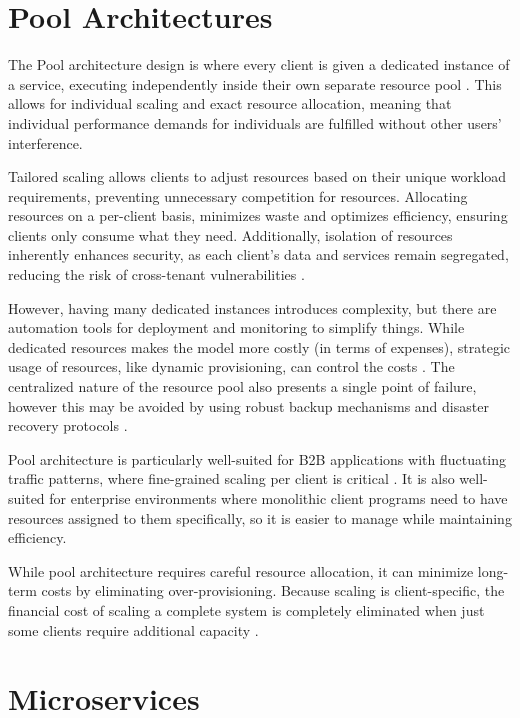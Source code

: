 \documentclass[]{final}
\begin{document}
\section{Pool Architectures}
The Pool architecture design is where every client is given a dedicated instance
of a service, executing independently inside their own separate resource pool \cite{cubet_microservice_nodate}.
This allows for individual scaling and exact resource allocation, meaning that
individual performance demands for individuals are fulfilled without other
users' interference.

Tailored scaling allows clients to adjust resources based on their unique
workload requirements, preventing unnecessary competition for resources.
Allocating resources on a per-client basis, minimizes waste and optimizes efficiency,
ensuring clients only consume what they need.
Additionally, isolation of resources inherently enhances security, as each client’s
data and services remain segregated, reducing the risk of cross-tenant
vulnerabilities \cite{cubet_microservice_nodate}.

However, having many dedicated instances introduces complexity, but there are automation
tools for deployment and monitoring to simplify things. While dedicated resources makes the model more
costly (in terms of expenses), strategic usage of resources, like dynamic provisioning, can control the costs \cite{cubet_microservice_nodate}. The
centralized nature of the resource pool also presents a single point of failure, however this may be
avoided by using robust backup mechanisms and disaster recovery protocols \cite{cubet_microservice_nodate}.

Pool architecture is particularly well-suited for B2B applications with
fluctuating traffic patterns,
where fine-grained scaling per client is critical \cite{cubet_microservice_nodate}. It is also well-suited
for enterprise environments where monolithic client programs need to have resources
assigned to them specifically, so it is easier to manage while maintaining efficiency.

While pool architecture requires careful resource allocation, it can minimize
long-term costs by eliminating over-provisioning. Because scaling is client-specific,
the financial cost of scaling a complete system is completely eliminated when just some
clients require additional capacity \cite{cubet_microservice_nodate}.

\section{Microservices}
\end{document}
